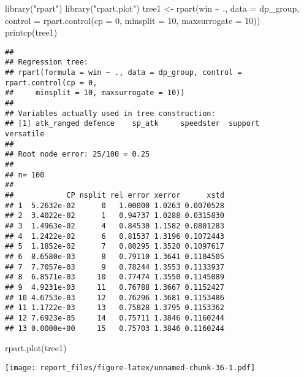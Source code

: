 \documentclass[
]{article}
\newenvironment{Shaded}{\begin{snugshade}}{\end{snugshade}}
\newcommand{\AttributeTok}[1]{\textcolor[rgb]{0.77,0.63,0.00}{#1}}
\newcommand{\DecValTok}[1]{\textcolor[rgb]{0.00,0.00,0.81}{#1}}
\newcommand{\FunctionTok}[1]{\textcolor[rgb]{0.00,0.00,0.00}{#1}}
\newcommand{\NormalTok}[1]{#1}
\newcommand{\OtherTok}[1]{\textcolor[rgb]{0.56,0.35,0.01}{#1}}
\newcommand{\SpecialCharTok}[1]{\textcolor[rgb]{0.00,0.00,0.00}{#1}}
\newcommand{\StringTok}[1]{\textcolor[rgb]{0.31,0.60,0.02}{#1}}
\begin{document}
\begin{Shaded}
\begin{Highlighting}[]
\FunctionTok{library}\NormalTok{(}\StringTok{"rpart"}\NormalTok{)}
\FunctionTok{library}\NormalTok{(}\StringTok{"rpart.plot"}\NormalTok{)}
\NormalTok{tree1 }\OtherTok{\textless{}{-}} \FunctionTok{rpart}\NormalTok{(win }\SpecialCharTok{\textasciitilde{}}\NormalTok{ ., }\AttributeTok{data =}\NormalTok{ dp\_group, }\AttributeTok{control =} \FunctionTok{rpart.control}\NormalTok{(}\AttributeTok{cp =} \DecValTok{0}\NormalTok{, }\AttributeTok{minsplit =} \DecValTok{10}\NormalTok{, }\AttributeTok{maxsurrogate =} \DecValTok{10}\NormalTok{))}
\FunctionTok{printcp}\NormalTok{(tree1)}
\end{Highlighting}
\end{Shaded}

\begin{verbatim}
## 
## Regression tree:
## rpart(formula = win ~ ., data = dp_group, control = rpart.control(cp = 0, 
##     minsplit = 10, maxsurrogate = 10))
## 
## Variables actually used in tree construction:
## [1] atk_ranged defence    sp_atk     speedster  support    versatile 
## 
## Root node error: 25/100 = 0.25
## 
## n= 100 
## 
##            CP nsplit rel error xerror      xstd
## 1  5.2632e-02      0   1.00000 1.0263 0.0070528
## 2  3.4022e-02      1   0.94737 1.0288 0.0315830
## 3  1.4963e-02      4   0.84530 1.1582 0.0801283
## 4  1.2422e-02      6   0.81537 1.3196 0.1072443
## 5  1.1852e-02      7   0.80295 1.3520 0.1097617
## 6  8.6580e-03      8   0.79110 1.3641 0.1104505
## 7  7.7057e-03      9   0.78244 1.3553 0.1133937
## 8  6.8571e-03     10   0.77474 1.3550 0.1145089
## 9  4.9231e-03     11   0.76788 1.3667 0.1152427
## 10 4.6753e-03     12   0.76296 1.3681 0.1153486
## 11 1.1722e-03     13   0.75828 1.3795 0.1153362
## 12 7.6923e-05     14   0.75711 1.3846 0.1160244
## 13 0.0000e+00     15   0.75703 1.3846 0.1160244
\end{verbatim}

\begin{Shaded}
\begin{Highlighting}[]
\FunctionTok{rpart.plot}\NormalTok{(tree1)}
\end{Highlighting}
\end{Shaded}

\texttt{[image: report\_files/figure-latex/unnamed-chunk-36-1.pdf]}

\begin{Shaded}
\end{Shaded}
\end{document}

